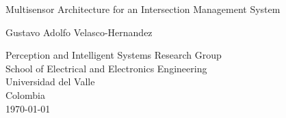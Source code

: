 \begin{titlepage}
    \begin{center}
        \vspace*{1cm}
        \Huge
        
        Multisensor Architecture for an Intersection Management System
    
        \vspace{4.5cm}
        \LARGE
        Gustavo Adolfo Velasco-Hernandez
        
        \vfill
        \large
        \vspace{0.8cm}
        
        Perception and Intelligent Systems Research Group \\
        School of Electrical and Electronics Engineering\\
        Universidad del Valle\\
        Colombia\\
        \today
        
    \end{center}
\end{titlepage}